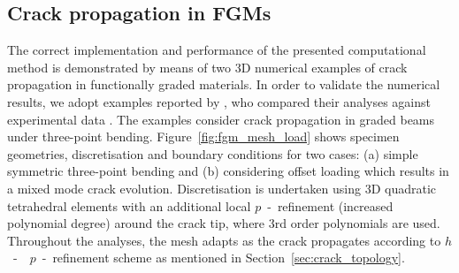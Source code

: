 \documentclass[onecolumn]{svjour3}
\begin{document}
\subsection{Crack propagation in FGMs} \label{sec:crack_propagation_FGM} 
% 
The correct implementation and performance of the presented computational method is demonstrated by means of two 3D numerical examples of crack propagation in functionally graded materials. In order to validate the numerical results, we adopt examples reported by \cite{kim2004simulation}, who compared their analyses against experimental data \cite{galvez1996crack, rousseau2000compositionally}. The examples consider crack propagation in graded beams under three-point bending. Figure~\ref{fig:fgm_mesh_load} shows specimen geometries, discretisation and boundary conditions for two cases: (a) simple symmetric three-point bending and (b) considering offset loading which results in a mixed mode crack evolution. Discretisation is undertaken using 3D quadratic tetrahedral elements with an additional local $p$~-~refinement (increased polynomial degree) around the crack tip, where 3rd order polynomials are used.
Throughout the analyses, the mesh adapts as the crack propagates according to $h$~-~~$p$~-~refinement scheme as mentioned in Section~\ref{sec:crack_topology}.
\end{document}
